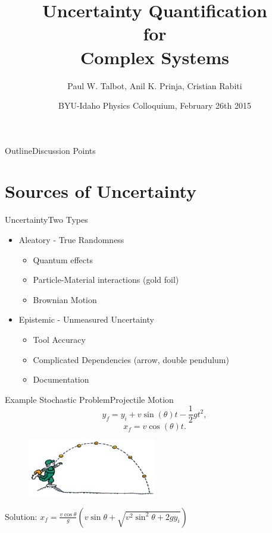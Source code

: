 \documentclass{beamer}
\title[Numerical UQ Methods] %
{Uncertainty Quantification\\ for\\ Complex Systems}
\author[Talbot] %
{Paul W. Talbot\inst{1}, Anil K. Prinja\inst{1}, Cristian Rabiti\inst{2}}
\institute[University of New Mexico] %
{
  \inst{1}%
  University of New Mexico\\
  \inst{2}
  Idaho National Laboratory
}
\date[BYU-I, 2014] %
{BYU-Idaho Physics Colloquium, February 26th 2015}
\begin{document}
\begin{frame}
  \titlepage
\end{frame}

\begin{frame}{Outline}{Discussion Points}\vspace{-20pt}
  \tableofcontents[pausesections]
\end{frame}

\section{Sources of Uncertainty}
\begin{frame}{Uncertainty}{Two Types}\vspace{-30pt}
\begin{itemize}
\item Aleatory - True Randomness
\begin{itemize}
  \item Quantum effects
  \item Particle-Material interactions (gold foil)
  \item Brownian Motion
\end{itemize}\vspace{20pt}
\item Epistemic - Unmeasured Uncertainty
  \begin{itemize}
  \item Tool Accuracy
  \item Complicated Dependencies (arrow, double pendulum)
  \item Documentation
  \end{itemize}
\end{itemize}
\end{frame}

\begin{frame}{Example Stochastic Problem}{Projectile Motion}\vspace{-30pt}
\begin{equation*}
y_f=y_i + v\sin(\theta)t - \frac{1}{2}gt^2,
\end{equation*}
\begin{equation*}
x_f=v\cos(\theta)t.
\end{equation*}
  \begin{figure}[h!]
    \centering
      \includegraphics[width=0.5\textwidth]{../graphics/projectile}
  \end{figure}
\vspace{-10pt}
Solution: $x_f=\frac{v\cos{\theta}}{g}\left(v\sin\theta+\sqrt{v^2\sin^2\theta + 2gy_i}\right)$
\end{frame}
\end{document}
